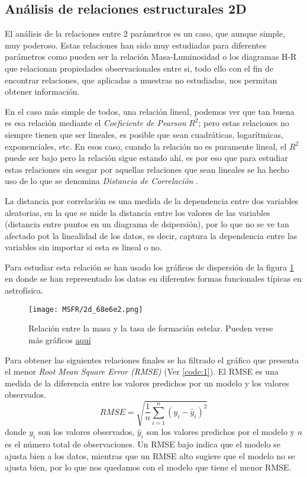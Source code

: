 \documentclass[11pt, a4paper]{article} %
\begin{document}
\subsection{Análisis de relaciones estructurales 2D}

El análisis de la relaciones entre 2 parámetros es un caso, que aunque simple, muy poderoso. Estas relaciones han sido muy estudiadas para diferentes parámetros 
como pueden ser la relación Masa-Luminosidad o los diagramas H-R que relacionan propiedades observacionales entre si, todo ello con el fin de encontrar relaciones, que aplicadas a muestras no estudiadas, nos permitan obtener información. 

En el caso más simple de todos, una relación lineal, podemos ver que tan buena es esa relación mediante el \textit{ Coeficiente de Pearson} $R^2$; pero 
estas relaciones no siempre tienen que ser lineales, es posible que sean cuadráticas, logarítmicas, exponenciales, etc. En esos caso, cuando la relación no es puramente lineal, el $R^2$ puede ser bajo
pero la relación sigue estando ahí, es por eso que para estudiar estas relaciones sin sesgar por aquellas relaciones que sean lineales se ha hecho uso de lo que se denomina \textit{Distancia de Correlación} \autocite{dcor}.

La distancia por correlación es una medida de la dependencia entre dos variables aleatorias, en la que se mide la distancia entre los valores de las variables (distancia entre puntos en un diagrama de dsipersión), por lo que no se ve tan afectado pot la 
linealidad de los datos, es decir, captura la dependencia entre las variables sin importar si esta es lineal o no.

Para estudiar esta relación se han usado los gráficos de dispersión de la figura \ref{fig:MSFR} en donde se han representado los datos en diferentes formas funcionales típicas en astrofísica.

\begin{figure}[H]
    \centering
    \texttt{[image: MSFR/2d\_68e6e2.png]}
    \caption{Relación entre la masa y la tasa de formación estelar. Pueden verse más gráficos \href{https://github.com/PhyAMR/TFG/tree/main/MSFR}{aquí}}
    \label{fig:MSFR}
\end{figure}

Para obtener las siguientes relaciones finales se ha filtrado el gráfico que presenta el menor \textit{Root Mean Square Error (RMSE)} (Ver \ref{code:1}). El RMSE es una medida de la diferencia entre los valores predichos por un modelo y los valores observados. 
\begin{equation}
    RMSE = \sqrt{\frac{1}{n}\sum_{i=1}^{n}(y_i - \hat{y}_i)^2}
\end{equation}
donde $y_i$ son los valores observados, $\hat{y}_i$ son los valores predichos por el modelo y $n$ es el número total de observaciones. Un RMSE bajo indica que el modelo se ajusta bien a los datos, mientras que un RMSE alto sugiere que el modelo no se ajusta bien, por lo que nos quedamos con el modelo que tiene el menor RMSE.
\end{document}
